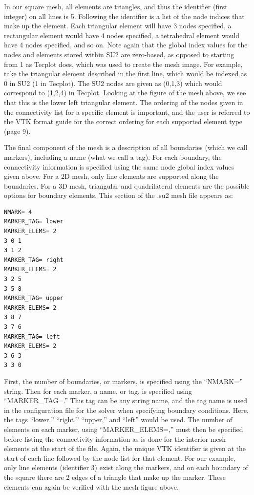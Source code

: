 \documentclass{article}
\begin{document}
In our square mesh, all elements are triangles, and thus the identifier (first integer) on all lines is 5. Following the identifier is a list of the node indices that make up the element. Each triangular element will have 3 nodes specified, a rectangular element would have 4 nodes specified, a tetrahedral element would have 4 nodes specified, and so on. Note again that the global index values for the nodes and elements stored within SU2 are zero-based, as opposed to starting from 1 as Tecplot does, which was used to create the mesh image. For example, take the triangular element described in the first line, which would be indexed as 0 in SU2 (1 in Tecplot). The SU2 nodes are given as (0,1,3) which would correspond to (1,2,4) in Tecplot. Looking at the figure of the mesh above, we see that this is the lower left triangular element. The ordering of the nodes given in the connectivity list for a specific element is important, and the user is referred to the VTK format guide for the correct ordering for each supported element type (page 9).

The final component of the mesh is a description of all boundaries (which we call markers), including a name (what we call a tag). For each boundary, the connectivity information is specified using the same node global index values given above. For a 2D mesh, only line elements are supported along the boundaries. For a 3D mesh, triangular and quadrilateral elements are the possible options for boundary elements. This section of the .su2 mesh file appears as:

\begin{lstlisting}
NMARK= 4
MARKER_TAG= lower
MARKER_ELEMS= 2
3 0 1
3 1 2
MARKER_TAG= right
MARKER_ELEMS= 2
3 2 5
3 5 8
MARKER_TAG= upper
MARKER_ELEMS= 2
3 8 7
3 7 6
MARKER_TAG= left
MARKER_ELEMS= 2
3 6 3
3 3 0
\end{lstlisting}


First, the number of boundaries, or markers, is specified using the “NMARK=” string. Then for each marker, a name, or tag, is specified using “MARKER\_TAG=.” This tag can be any string name, and the tag name is used in the configuration file for the solver when specifying boundary conditions. Here, the tags “lower,” “right,” “upper,” and “left” would be used. The number of elements on each marker, using “MARKER\_ELEMS=,” must then be specified before listing the connectivity information as is done for the interior mesh elements at the start of the file. Again, the unique VTK identifier is given at the start of each line followed by the node list for that element. For our example, only line elements (identifier 3) exist along the markers, and on each boundary of the square there are 2 edges of a triangle that make up the marker. These elements can again be verified with the mesh figure above.
\end{document}

